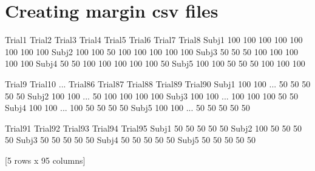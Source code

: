 \documentclass[letterpaper,10pt,english]{jupyterBook}
\begin{document}
\section{Creating margin csv files}
\label{\detokenize{data-processing:creating-margin-csv-files}}
\begin{sphinxVerbatim}[commandchars=\\\{\}]
  \PYG{p}{[}    \PYG{p}{]}
  
   
\end{sphinxVerbatim}

\begin{sphinxVerbatim}[commandchars=\\\{\}]
        Trial1  Trial2  Trial3  Trial4  Trial5  Trial6  Trial7  Trial8  \PYGZbs{}
Subj\PYGZus{}1     100     100     100     100     100     100     100     100   
Subj\PYGZus{}2     100     100      50     100     100     100     100     100   
Subj\PYGZus{}3      50      50      50     100     100     100     100     100   
Subj\PYGZus{}4      50      50     100     100     100     100     100      50   
Subj\PYGZus{}5     100     100      50      50      50     100     100     100   

        Trial9  Trial10  ...  Trial86  Trial87  Trial88  Trial89  Trial90  \PYGZbs{}
Subj\PYGZus{}1     100      100  ...       50       50       50       50       50   
Subj\PYGZus{}2     100      100  ...       50      100      100      100      100   
Subj\PYGZus{}3     100      100  ...      100      100      100       50       50   
Subj\PYGZus{}4     100      100  ...      100       50       50       50       50   
Subj\PYGZus{}5     100      100  ...       50       50       50       50       50   

        Trial91  Trial92  Trial93  Trial94  Trial95  
Subj\PYGZus{}1       50       50       50       50       50  
Subj\PYGZus{}2      100       50       50       50       50  
Subj\PYGZus{}3       50       50       50       50       50  
Subj\PYGZus{}4       50       50       50       50       50  
Subj\PYGZus{}5       50       50       50       50       50  

[5 rows x 95 columns]
\end{sphinxVerbatim}
\end{document}

